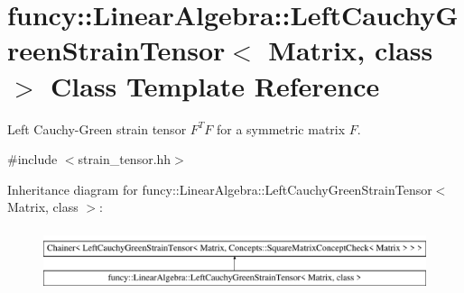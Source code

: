 \hypertarget{classfuncy_1_1LinearAlgebra_1_1LeftCauchyGreenStrainTensor}{\section{funcy\-:\-:Linear\-Algebra\-:\-:Left\-Cauchy\-Green\-Strain\-Tensor$<$ Matrix, class $>$ Class Template Reference}
\label{classfuncy_1_1LinearAlgebra_1_1LeftCauchyGreenStrainTensor}
}


Left Cauchy-\/\-Green strain tensor $ F^T F $ for a symmetric matrix $ F $.  




{\ttfamily \#include $<$strain\-\_\-tensor.\-hh$>$}

Inheritance diagram for funcy\-:\-:Linear\-Algebra\-:\-:Left\-Cauchy\-Green\-Strain\-Tensor$<$ Matrix, class $>$\-:\begin{figure}[H]
\begin{center}
\leavevmode
\includegraphics[height=1.851240cm]{classfuncy_1_1LinearAlgebra_1_1LeftCauchyGreenStrainTensor}
\end{center}
\end{figure}
